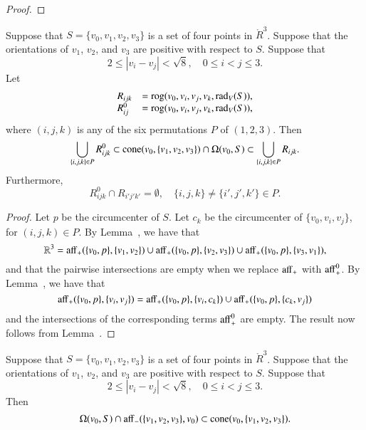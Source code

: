 \begin{proof}
\end{proof}
\newpage

\begin{lemma}
Suppose that $S=\{v_0,v_1,v_2,v_3\}$ is a set
of four points in $\ring{R}^3$.  Suppose that 
the orientations of $v_1$, $v_2$, and $v_3$ are positive with respect
to $S$.  Suppose that 
  $$
  2 \le |v_i - v_j | < \sqrt8, \quad 0\le i < j \le 3.
  $$
Let 
   $$
   \begin{array}{lll}
   R_{ijk} &= {\operatorname{rog}}(v_0,v_i,v_j,v_k,\operatorname{rad}_V(S)),\\
   R^0_{ij} &= {\operatorname{rog}}(v_0,v_i,v_j,v_k,\operatorname{rad}_V(S)),
   \end{array}
   $$
where $(i,j,k)$ is any of the six permutations $P$ of $(1,2,3)$.
Then
   $$
   \bigcup_{\{i,j,k\}\in P} R_{ijk}^0\subset
   {\operatorname{cone}}(v_0,\{v_1,v_2,v_3\})\cap \Omega(v_0,S) \subset
   \bigcup_{\{i,j,k\}\in P} R_{ijk}.
   $$
Furthermore,
   $$
   R_{ijk}^0 \cap R_{i'j'k'} =\emptyset,\quad
   \{i,j,k\}\ne\{i',j',k'\}\in P.
   $$
\end{lemma}

\begin{proof} Let $p$ be the circumcenter of $S$.  Let $c_k$
be the circumcenter of $\{v_0,v_i,v_j\}$, for $(i,j,k)\in P$.
By Lemma~, we have that
   $$
   \mathbb{R}^3 = {\operatorname{aff}}_+(\{v_0,p\},\{v_1,v_2\}) \cup
     {\operatorname{aff}}_+(\{v_0,p\},\{v_2,v_3\}) \cup
     {\operatorname{aff}}_+(\{v_0,p\},\{v_3,v_1\}),
   $$
and that the pairwise intersections are empty when we replace
${\operatorname{aff}}_+$ with ${\operatorname{aff}}_+^0$.  By Lemma~,
we have that 
  $$
  {\operatorname{aff}}_+(\{v_0,p\},\{v_i,v_j\}) =
{\operatorname{aff}}_+(\{v_0,p\},\{v_i,c_k\}) \cup
{\operatorname{aff}}_+(\{v_0,p\},\{c_k,v_j\})
  $$
and the intersections of the corresponding terms ${\operatorname{aff}}_+^0$ 
are empty.
The result now follows from Lemma~.
\end{proof}

\newpage

\begin{lemma}
Suppose that $S=\{v_0,v_1,v_2,v_3\}$ is a set
of four points in $\ring{R}^3$.  Suppose that 
the orientations of $v_1$, $v_2$, and $v_3$ are positive with respect
to $S$.  Suppose that 
  $$
  2 \le |v_i - v_j | < \sqrt8, \quad 0\le i < j \le 3.
  $$
Then
  $$
  \Omega(v_0,S) \cap {\operatorname{aff}}_-(\{v_1,v_2,v_3\},v_0) \subset
  {\operatorname{cone}}(v_0,\{v_1,v_2,v_3\}).
  $$
\end{lemma}




